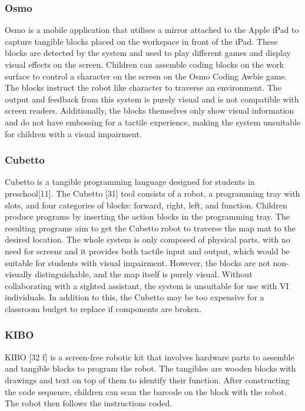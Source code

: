 \documentclass[oneside,%
                    author={Malak Hajji},
                    degree={BSc},
                    title={Designing An Accessible Computational Toolkit For Students},
                  subtitle={With Mixed Visual Abilities}]{dissertation}
\begin{document}
\subsubsection{Osmo}
Osmo is a mobile application that utilises a mirror attached to the Apple iPad to capture tangible blocks placed on the workspace in front of the iPad. These blocks are detected by the system and used to play different games and display visual effects on the screen. Children can assemble coding blocks on the work surface to control a character on the screen on the Osmo Coding Awbie game. The blocks instruct the robot like character to traverse an environment. The output and feedback from this system is purely visual and is not compatible with screen readers. Additionally, the blocks themselves only show visual information and do not have embossing for a tactile experience, making the system unsuitable for children with a visual impairment.  

\subsubsection{Cubetto}
Cubetto is a tangible programming language designed for students in preschool[11]. The Cubetto [31] tool consists of a robot, a programming tray with slots, and four categories of blocks: forward, right, left, and function. Children produce programs by inserting the action blocks in the programming tray. The resulting programs aim to get the Cubetto robot to traverse the map mat to the desired location. The whole system is only composed of physical parts, with no need for screens and it provides both tactile input and output, which would be suitable for students with visual impairment. However, the blocks are not non-visually distinguishable, and the map itself is purely visual. Without collaborating with a sighted assistant, the system is unsuitable for use with VI individuals. In addition to this, the Cubetto may be too expensive for a classroom budget to replace if components are broken.  

\subsubsection{KIBO}
KIBO [32 f] is a screen-free robotic kit that involves hardware parts to assemble and tangible blocks to program the robot. The tangibles are wooden blocks with drawings and text on top of them to identify their function. After constructing the code sequence, children can scan the barcode on the block with the robot. The robot then follows the instructions coded.  
\end{document}
